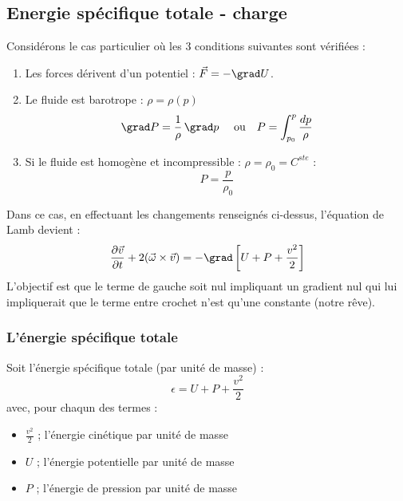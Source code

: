 	\subsection{Energie spécifique totale - charge}
	Considérons le cas particulier où les 3 conditions suivantes sont vérifiées :
	\begin{enumerate}
	\item Les forces dérivent d'un potentiel : $\vec{F} = -\grad U$.
	\item Le fluide est barotrope : $\rho = \rho(p)$
	\begin{equation}
	\grad P  = \frac{1}{\rho}\,\grad p\ \ \ \ \text{ou }\ \ P = \int_{p_0}^p \frac{dp}
	{\rho}
	\end{equation}
	\item Si le fluide est homogène et incompressible : $\rho = \rho_0 = C^{ste}$ :
	\begin{equation}
	P = \frac{p}{\rho_0}
	\end{equation}
	\end{enumerate}	
	Dans ce cas, en effectuant les changements renseignés ci-dessus, l'équation de
	Lamb devient :
	\begin{equation}
	\frac{\partial \vec{v}}{\partial t} + 2(\vec{\omega}\times\vec{v}) = -\grad\left[
	U + P +\frac{v^2}{2}\right]
	\end{equation}
	L'objectif est que le terme de gauche soit nul impliquant un gradient nul qui lui
	impliquerait que le terme entre crochet n'est qu'une constante (notre rêve).
	
		\subsubsection{L'énergie spécifique totale}
		Soit l'énergie spécifique totale (par unité de masse) :
		\begin{equation}
		\epsilon = U + P + \frac{v^2}{2}
		\end{equation}
		avec, pour chaqun des termes :
		\begin{itemize}
		\item $\frac{v^2}{2}$ ; l'énergie cinétique par unité de masse
		\item $U$ ; l'énergie potentielle par unité de masse
		\item $P$ ; l'énergie de pression par unité de masse
		\end{itemize}
		
